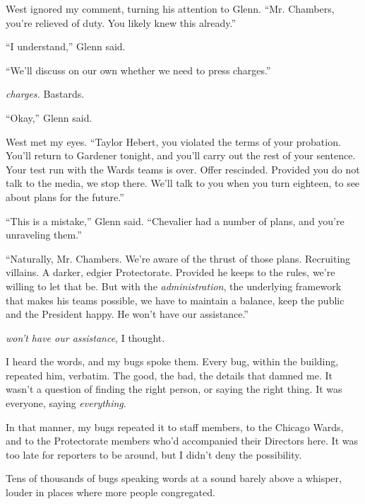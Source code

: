 West ignored my comment, turning his attention to Glenn.  ``Mr. Chambers, you're relieved of duty.  You likely knew this already.''



``I understand,'' Glenn said.



``We'll discuss on our own whether we need to press charges.''



\emph{\ldotsPress charges.}  Bastards.



``Okay,'' Glenn said.



West met my eyes.  ``Taylor Hebert, you violated the terms of your probation.  You'll return to Gardener tonight, and you'll carry out the rest of your sentence.  Your test run with the Wards teams is over.  Offer rescinded.  Provided you do not talk to the media, we stop there.  We'll talk to you when you turn eighteen, to see about plans for the future.''



``This is a mistake,'' Glenn said.  ``Chevalier had a number of plans, and you're unraveling them.''



``Naturally, Mr. Chambers.  We're aware of the thrust of those plans.  Recruiting villains.  A darker, edgier Protectorate.  Provided he keeps to the rules, we're willing to let that be.  But with the \emph{administration}, the underlying framework that makes his teams possible, we have to maintain a balance, keep the public and the President happy.  He won't have our assistance.''



\emph{\ldotsHe won't have our assistance}, I thought.



I heard the words, and my bugs spoke them.  Every bug, within the building, repeated him, verbatim.  The good, the bad, the details that damned me.  It wasn't a question of finding the right person, or saying the right thing.  It was everyone, saying \emph{everything}.



In that manner, my bugs repeated it to staff members, to the Chicago Wards, and to the Protectorate members who'd accompanied their Directors here.  It was too late for reporters to be around, but I didn't deny the possibility.



Tens of thousands of bugs speaking words at a sound barely above a whisper, louder in places where more people congregated.



